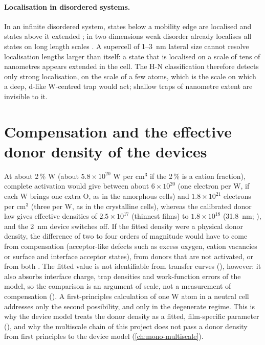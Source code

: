 \paragraph{Localisation in disordered systems.} In an infinite disordered system, states below a mobility edge are
localised and states above it extended \citep{Anderson1958,Mott1969}; in two dimensions weak disorder already localises
all states on long length scales \citep{Abrahams1979}. A supercell of 1--3~nm lateral size cannot resolve localisation
lengths larger than itself: a state that is localised on a scale of tens of nanometres appears extended in the cell.
The H-N classification therefore detects only strong localisation, on the scale of a few atoms, which is the scale
on which a deep, d-like W-centred trap would act; shallow traps of nanometre extent are invisible to it.

\section{Compensation and the effective donor density of the devices}
\label{sec:mono-defect-compensation}

At about 2\,\% W (about $5.8\times10^{20}$ W per cm$^3$ if the 2\,\% is a cation fraction), complete activation would
give between about $6\times10^{20}$ (one electron per W, if each W brings one extra O, as in the amorphous cells) and
$1.8\times10^{21}$ electrons per cm$^3$ (three per W, as in the crystalline cells), whereas the
calibrated donor law gives effective densities of $2.5\times10^{17}$ (thinnest films) to $1.8\times10^{18}$\cmcu{} (31.8~nm; ),
and the 2~nm device switches off. If the fitted density were a physical donor density, the difference of two to four orders of magnitude would have
to come from compensation (acceptor-like defects such as excess oxygen, cation vacancies or surface and interface
acceptor states), from donors that are not activated, or from both \citep{Lany2007}. The fitted value is not
identifiable from transfer curves (), however: it also absorbs interface charge, trap densities and
work-function errors of the model, so the comparison is an argument of scale, not a measurement of compensation
(). A first-principles calculation of one W atom in a neutral cell
addresses only the second possibility, and only in the degenerate regime. This is why the device model treats the
donor density as a fitted, film-specific parameter (), and why the multiscale chain of this project does
not pass a donor density from first principles to the device model (\cref{ch:mono-multiscale}).

